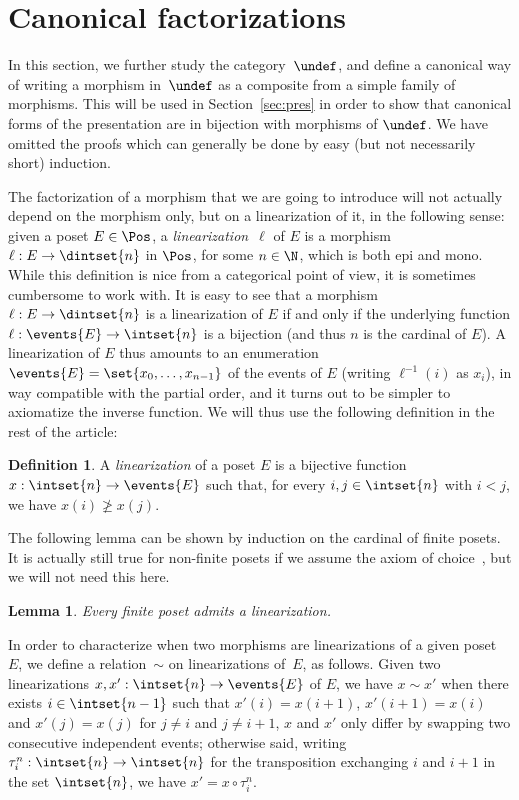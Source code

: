 \documentclass[submission,copyright,creativecommons]{eptcs}
\let\P\undef
\newtheorem{lemma}[theorem]{Lemma}
\theoremstyle{definition}
\newtheorem{definition}[theorem]{Definition}
\theoremstyle{remark}
\renewcommand{\geq}{\geqslant}
\begin{document}
\section{Canonical factorizations}
\label{sec:cf}
In this section, we further study the category~$\P$, and define a canonical way
of writing a morphism in~$\P$ as a composite from a simple family of
morphisms. This will be used in Section~\ref{sec:pres} in order to show that
canonical forms of the presentation are in bijection with morphisms of $\P$. We
have omitted the proofs which can generally be done by easy (but not necessarily
short) induction.

The factorization of a morphism that we are going to introduce will not actually
depend on the morphism only, but on a linearization of it, in the following
sense: given a poset $E\in\Pos$, a \emph{linearization}~$\ell$ of $E$ is a
morphism $\ell:E\to\dintset{n}$ in $\Pos$, for some $n\in\N$, which is both epi
and mono.
While this definition is nice from a categorical point of view, it is sometimes
cumbersome to work with. It is easy to see that a morphism
$\ell:E\to\dintset{n}$ is a linearization of $E$ if and only if the underlying
function $\ell:\events{E}\to\intset{n}$ is a bijection (and thus $n$ is the
cardinal of $E$). A linearization of $E$ thus amounts to an enumeration
$\events{E}=\set{x_0,\ldots,x_{n-1}}$ of the events of $E$ (writing
$\ell^{-1}(i)$ as $x_i$), in way compatible with the partial order, and it turns
out to be simpler to axiomatize the inverse function. We will thus use the
following definition in the rest of the article:

\begin{definition}
  \label{def:linearization}
  A \emph{linearization} of a poset $E$ is a bijective function
  $x:\intset{n}\to\events{E}$ such that, for every $i,j\in\intset{n}$ with
  $i<j$, we have $x(i)\not\geq x(j)$.
\end{definition}

\noindent
The following lemma can be shown by induction on the cardinal of finite
posets. It is actually still true for non-finite posets if we assume the axiom
of choice~\cite{szpilrajn1930extension}, but we will not need this here.

\begin{lemma}
  Every finite poset admits a linearization.
\end{lemma}

\noindent
In order to characterize when two morphisms are linearizations of a given
poset~$E$, we define a relation~$\sim$ on linearizations of~$E$, as
follows. Given two linearizations $x,x':\intset{n}\to\events{E}$ of $E$, we have
$x\sim x'$ when there exists $i\in\intset{n-1}$ such that $x'(i)=x(i+1)$,
$x'(i+1)=x(i)$ and $x'(j)=x(j)$ for $j\neq i$ and $j\neq i+1$, \ie $x$ and $x'$
only differ by swapping two consecutive independent events; otherwise said,
writing $\tau^n_i:\intset{n}\to\intset{n}$ for the transposition exchanging $i$
and $i+1$ in the set $\intset{n}$, we have $x'=x\circ\tau^n_i$.
\end{document}
